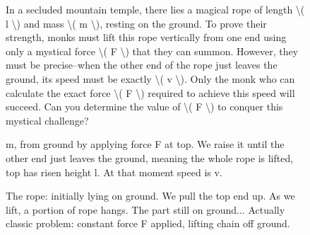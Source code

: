 \begin{figure}[t]
\centering
\setlength{\columnsep}{12pt}
\setlength{\colw}{\dimexpr(\linewidth-2\columnsep)/3\relax}
\begin{promptrow}
\caret{}\par\vspace{4pt}
In a secluded mountain temple, there lies a magical rope of length \textbackslash{}( l \textbackslash{}) and mass \textbackslash{}( m \textbackslash{}), resting on the ground. To prove their strength, monks must lift this rope vertically from one end using only a mystical force \textbackslash{}( F \textbackslash{}) that they can summon. However, they must be precise--when the other end of the rope just leaves the ground, its speed must be exactly \textbackslash{}( v \textbackslash{}). Only the monk who can calculate the exact force \textbackslash{}( F \textbackslash{}) required to achieve this speed will succeed. Can you determine the value of \textbackslash{}( F \textbackslash{}) to conquer this mystical challenge?
\par\vspace{6pt}
{}\par\vspace{3pt}
{\monofont\footnotesize {}}
\end{promptrow}\par
\vspace{12pt}
\noindent
\begin{reasoncol}[equal height group=reasX4]
  \par\vspace{1pt}
  \caret{}\par\vspace{4pt}
  \raggedright {}  m, from ground by applying force F at top. We raise it until the other end just leaves the ground, meaning the whole rope is lifted, top has risen height l. At that moment speed is v.\par
  The rope: initially lying on ground. We pull the top end up. As we lift, a portion of rope hangs. The part still on ground... Actually classic problem: constant force F applied, lifting chain off ground.\par\vspace{3pt}\elide
\end{reasoncol}\hspace{\columnsep}%
\begin{reasoncol}[equal height group=reasX4]

\end{reasoncol}
\end{figure}
